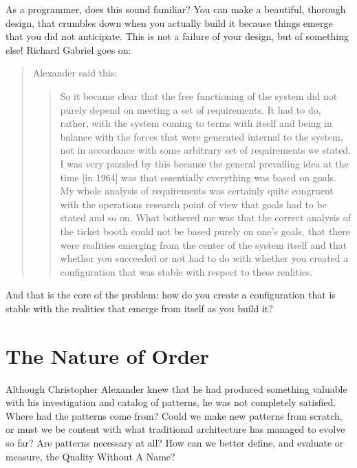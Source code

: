 As a programmer, does this sound familiar?  You can make a beautiful, thorough
design, that crumbles down when you actually build it because things emerge that
you did not anticipate. This is not a failure of your design, but of something
else! Richard Gabriel goes on:
\begin{quote}
Alexander said this:
\begin{quote}
So it became clear that the free functioning of the system did not purely depend
on meeting a set of requirements. It had to do, rather, with the system coming
to terms with itself and being in balance with the forces that were generated
internal to the system, not in accordance with some arbitrary set of
requirements we stated. I was very puzzled by this because the general
prevailing idea at the time [in 1964] was that essentially everything was based
on goals. My whole analysis of requirements was certainly quite congruent with
the operations research point of view that goals had to be stated and so on. 
What bothered me was that the correct analysis of the ticket booth could not be
based purely on one’s goals, that there were realities emerging from the center
of the system itself and that whether you succeeded or not had to do with
whether you created a configuration that was stable with respect to these
realities.\end{quote}                                                           
                                                                                
  \end{quote}
And that is the core of the problem:  how do you create a configuration that is
stable with the realities that emerge from itself as you build it?

\section*{The Nature of Order}

Although Christopher Alexander knew that he had produced something valuable with
his investigation and catalog of patterns, he was not completely satisfied.
Where had the patterns come from? Could we make new patterns from scratch, or
must we be content with what traditional architecture has managed to evolve so
far? Are patterns necessary at all?  How can we better define, and evaluate or
measure, the Quality Without A Name?

